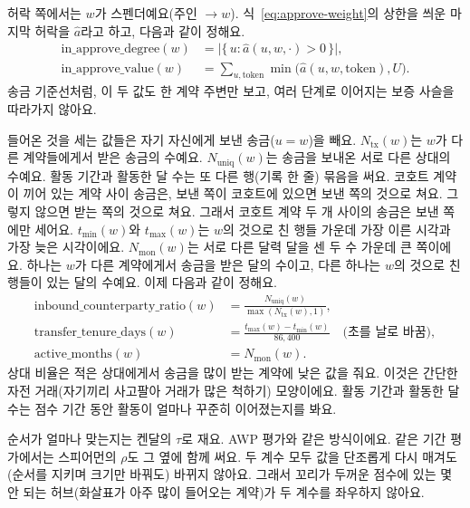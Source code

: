 
허락 쪽에서는 $w$가 스펜더예요(주인 $\to w$). 식~\eqref{eq:approve-weight}의 상한을 씌운 마지막 허락을 $\hat a$라고 하고, 다음과 같이 정해요.
\begin{align}
\mathrm{in\_approve\_degree}(w)
&=
\bigl|\{\,u : \hat a(u,w,\cdot)>0\,\}\bigr|,
\label{eq:in-approve-degree}\\
\mathrm{in\_approve\_value}(w)
&=
\sum_{u,\mathrm{token}} \min\bigl(\hat a(u,w,\mathrm{token}),U\bigr).
\label{eq:in-approve-value}
\end{align}
송금 기준선처럼, 이 두 값도 한 계약 주변만 보고, 여러 단계로 이어지는 보증 사슬을 따라가지 않아요.


들어온 것을 세는 값들은 자기 자신에게 보낸 송금($u=w$)을 빼요. $N_{\mathrm{tx}}(w)$는 $w$가 다른 계약들에게서 받은 송금의 수예요. $N_{\mathrm{uniq}}(w)$는 송금을 보내온 서로 다른 상대의 수예요. 활동 기간과 활동한 달 수는 또 다른 행(기록 한 줄) 묶음을 써요. 코호트 계약이 끼어 있는 계약 사이 송금은, 보낸 쪽이 코호트에 있으면 보낸 쪽의 것으로 쳐요. 그렇지 않으면 받는 쪽의 것으로 쳐요. 그래서 코호트 계약 두 개 사이의 송금은 보낸 쪽에만 세어요. $t_{\min}(w)$와 $t_{\max}(w)$는 $w$의 것으로 친 행들 가운데 가장 이른 시각과 가장 늦은 시각이에요. $N_{\mathrm{mon}}(w)$는 서로 다른 달력 달을 센 두 수 가운데 큰 쪽이에요. 하나는 $w$가 다른 계약에게서 송금을 받은 달의 수이고, 다른 하나는 $w$의 것으로 친 행들이 있는 달의 수예요. 이제 다음과 같이 정해요.
\begin{align}
\mathrm{inbound\_counterparty\_ratio}(w)
&=
\frac{N_{\mathrm{uniq}}(w)}{\max(N_{\mathrm{tx}}(w),1)},
\label{eq:counterparty-ratio}\\
\mathrm{transfer\_tenure\_days}(w)
&=
\frac{t_{\max}(w)-t_{\min}(w)}{86{,}400}\quad\text{(초를 날로 바꿈)},
\label{eq:tenure}\\
\mathrm{active\_months}(w)
&=
N_{\mathrm{mon}}(w).
\label{eq:active-months}
\end{align}
상대 비율은 적은 상대에게서 송금을 많이 받는 계약에 낮은 값을 줘요. 이것은 간단한 자전 거래(자기끼리 사고팔아 거래가 많은 척하기) 모양이에요. 활동 기간과 활동한 달 수는 점수 기간 동안 활동이 얼마나 꾸준히 이어졌는지를 봐요.


순서가 얼마나 맞는지는 켄달의 $\tau$로 재요. AWP 평가와 같은 방식이에요\parencite{do2023awp}. 같은 기간 평가에서는 스피어먼의 $\rho$도 그 옆에 함께 써요. 두 계수 모두 값을 단조롭게 다시 매겨도(순서를 지키며 크기만 바꿔도) 바뀌지 않아요. 그래서 꼬리가 두꺼운 점수에 있는 몇 안 되는 허브(화살표가 아주 많이 들어오는 계약)가 두 계수를 좌우하지 않아요.

